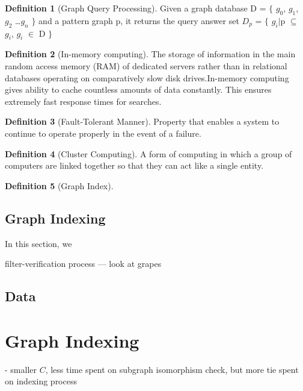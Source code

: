 \documentclass{l4proj}
\theoremstyle{definition}
\newtheorem{myDef}{Definition}
\begin{document}
        \begin{myDef}[Graph Query Processing]
        \label{def:graphQueryProcessing}
        Given a graph database D = $\{$ $g^{}_0$, $g^{}_1$, $g^{}_2$ \ldots $g^{}_n$ $\}$ and a pattern graph p, it returns the query answer set $D^{}_p$ = $\{$ $g^{}_i$$\vert$p $\subseteq$ $g^{}_i$, $g^{}_i$ $\in$ D $\}$
        
        \end{myDef}
        
        \begin{myDef}[In-memory computing]
        The storage of information in the main random access memory (RAM) of dedicated servers rather than in relational databases operating on comparatively slow disk drives.In-memory computing gives ability to cache countless amounts of data constantly. This ensures extremely fast response times for searches.
        \end{myDef}
        
        \begin{myDef} [Fault-Tolerant Manner] 
        Property that enables a system to continue to operate properly in the event of a failure.
        \end{myDef}
        
        \begin{myDef} [Cluster Computing]
        A form of computing in which a group of computers are linked together so that they can act like a single entity. 
        \end{myDef}
        
        \begin{myDef} [Graph Index]
		
		\end{myDef}
        
    \section{Graph Indexing}
        In this section, we  
        
        filter-verification process --- look at grapes
        
    \section{Data}

        
\chapter{Graph Indexing}
- smaller $C$, less time spent on subgraph isomorphism check, but more tie spent on indexing process
\end{document}
